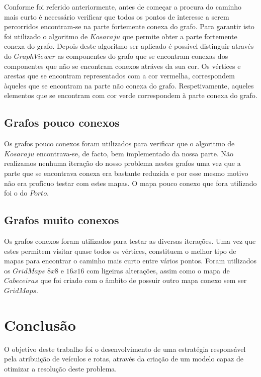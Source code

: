 \documentclass[article, a4paper, 12pt, oneside]{memoir}
\begin{document}
Conforme foi referido anteriormente, antes de começar a procura do caminho mais curto é necessário verificar que todos os pontos de interesse a serem percorridos encontram-se na
parte fortemente conexa do grafo. Para garantir isto foi utilizado o algoritmo de $Kosaraju$ que permite obter a parte fortemente conexa do grafo. Depois deste algoritmo ser aplicado
é possível distinguir através do $GraphViewer$ as componentes do grafo que se encontram conexas dos componentes que não se encontram conexos atráves da sua cor. Os vértices e arestas
que se encontram representados com a cor vermelha, correspondem àqueles que se encontram na parte não conexa do grafo. Respetivamente, aqueles elementos que se encontram com cor
verde correspondem à parte conexa do grafo.

\section{Grafos pouco conexos}
Os grafos pouco conexos foram utilizados para verificar que o algoritmo de $Kosaraju$ encontrava-se, de facto, bem implementado da nossa parte. Não 
realizamos nenhuma iteração do nosso problema nestes grafos uma vez que a parte que se encontrava conexa era bastante reduzida e por esse mesmo motivo não era profícuo
testar com estes mapas.
O mapa pouco conexo que fora utilizado foi o do $Porto$.

\section{Grafos muito conexos}
Os grafos conexos foram utilizados para testar as diversas iterações. Uma vez que estes permitem visitar quase todos os vértices, constituem o melhor tipo
de mapas para encontrar o caminho mais curto entre vários pontos. Foram utilizados os $GridMaps$ $8x8$ e $16x16$ com ligeiras alterações, assim como o mapa de $Cabeceiras$
que foi criado com o âmbito de possuir outro mapa conexo sem ser $GridMaps$.

\newpage
\chapter[Conclusão][Conclusão]{Conclusão} \label{\thechapter}

O objetivo deste trabalho foi o desenvolvimento de uma estratégia responsável pela atribuição de veículos e rotas, através da criação de um modelo capaz de otimizar a resolução deste problema.
\end{document}
